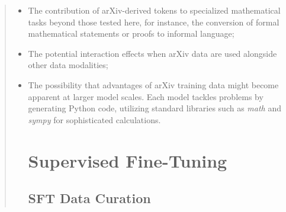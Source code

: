 \begin{abstract}
\begin{itemize}[topsep=0pt]
\begin{itemize}[topsep=0pt]
    \item The contribution of arXiv-derived tokens to specialized mathematical tasks beyond those tested here, for instance, the conversion of formal mathematical statements or proofs to informal language;
    \item The potential interaction effects when arXiv data are used alongside other data modalities;
    \item The possibility that advantages of arXiv training data might become apparent at larger model scales. Each model tackles problems by generating Python code, utilizing standard libraries such as \textit{math} and \textit{sympy} for sophisticated calculations. \section{Supervised Fine-Tuning}

\subsection{SFT Data Curation}


\end{itemize}
\end{itemize}
\end{abstract}
